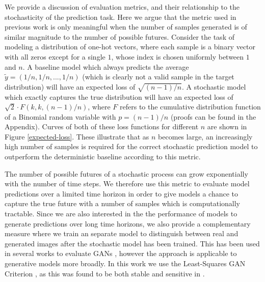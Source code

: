 \documentclass{article}
\begin{document}
We provide a discussion of evaluation metrics, and their relationship to the stochasticity of the prediction task.
Here we argue that the metric used in previous work \citep{Walker2016, Babaeizadeh2018, Denton2018} is only meaningful when the number of samples generated is of similar magnitude to the number of possible futures.
Consider the task of modeling a distribution of one-hot vectors, where each sample is a binary vector with all zeros except for a single $1$, whose index is chosen uniformly between $1$ and $n$.
A baseline model which always predicts the average $\tilde{y} = (1/n, 1/n, ..., 1/n)$ (which is clearly not a valid sample in the target distribution) will have an expected loss of $\sqrt{(n-1)/n}$. A stochastic model which exactly captures the true distribution will have an expected loss of $\sqrt{2} \cdot F(k, k, (n-1)/n)$, where $F$ refers to the cumulative distribution function of a Binomial random variable with $p=(n-1)/n$ (proofs can be found in the Appendix).
Curves of both of these loss functions for different $n$ are shown in Figure \ref{expected-loss}.
These illustrate that as $n$ becomes large, an increasingly high number of samples is required for the correct stochastic prediction model to outperform the deterministic baseline according to this metric.

The number of possible futures of a stochastic process can grow exponentially with the number of time steps.
We therefore use this metric to evaluate model predictions over a limited time horizon in order to give models a chance to capture the true future with a number of samples which is computationally tractable.
Since we are also interested in the the performance of models to generate predictions over long time horizons, we also provide a complementary measure where we train an separate model to distinguish between real and generated images after the stochastic model has been trained. This has been used in several works to evaluate GANs \citep{Danihelka17, Rosca17, GANeval}, however the approach is applicable to generative models more broadly. In this work we use the Least-Squares GAN Criterion \citep{Mao16}, as this was found to be both stable and sensitive in \citep{GANeval}.
\end{document}
